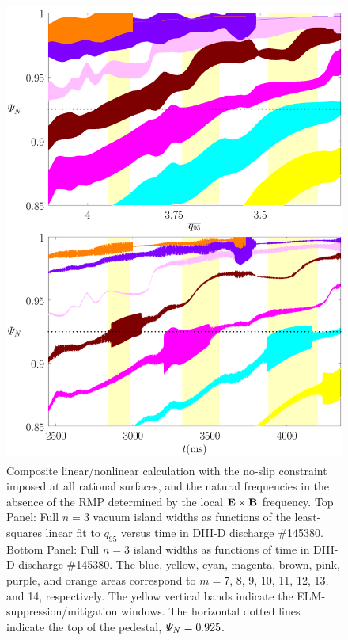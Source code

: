 \documentclass[12pt,prb,aps]{revtex4-1}
\begin{document}
\begin{figure}
\includegraphics[height=6in]{fig3.pdf}
\caption{Composite linear/nonlinear calculation with the no-slip constraint imposed at all rational surfaces, and the natural frequencies
in the absence of the RMP determined by the local  ${\bf E}\times {\bf B}$
frequency. Top Panel: Full  $n=3$ vacuum island widths as functions of the least-squares linear fit to $q_{95}$ versus time 
in   DIII-D discharge \#145380.
Bottom Panel:  Full $n=3$ island widths as functions of time
in   DIII-D discharge \#145380. The blue, yellow, cyan, magenta, brown, pink,
purple, and orange  areas correspond to $m=7$, 8, 9, 10, 11, 12, 13, and 14, respectively. The yellow vertical bands indicate the ELM-suppression/mitigation windows. 
The horizontal dotted lines indicate the top of the pedestal, ${\mit\Psi}_N=0.925$.} \label{fig3}
\end{figure}
\end{document}
